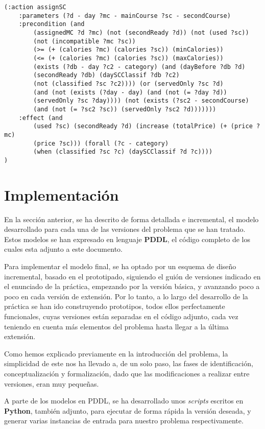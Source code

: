 \documentclass{article}
\begin{document}
\begin{lstlisting}[language=pddl]
(:action assignSC
    :parameters (?d - day ?mc - mainCourse ?sc - secondCourse)
    :precondition (and
        (assignedMC ?d ?mc) (not (secondReady ?d)) (not (used ?sc))
        (not (incompatible ?mc ?sc))
        (>= (+ (calories ?mc) (calories ?sc)) (minCalories))
        (<= (+ (calories ?mc) (calories ?sc)) (maxCalories))
        (exists (?db - day ?c2 - category) (and (dayBefore ?db ?d)
        (secondReady ?db) (daySCClassif ?db ?c2)
        (not (classified ?sc ?c2)))) (or (servedOnly ?sc ?d)
        (and (not (exists (?day - day) (and (not (= ?day ?d))
        (servedOnly ?sc ?day)))) (not (exists (?sc2 - secondCourse)
        (and (not (= ?sc2 ?sc)) (servedOnly ?sc2 ?d)))))))
    :effect (and
        (used ?sc) (secondReady ?d) (increase (totalPrice) (+ (price ?mc)
        (price ?sc))) (forall (?c - category)
        (when (classified ?sc ?c) (daySCClassif ?d ?c))))
)
\end{lstlisting}

\section{Implementación}
En la sección anterior, se ha descrito de forma detallada e incremental, el modelo desarrollado para cada una de las versiones del problema que se han tratado. Estos modelos se han expresado en lenguaje \textbf{PDDL}, el código completo de los cuales esta adjunto a este documento.
\par
Para implementar el modelo final, se ha optado por un esquema de diseño incremental, basado en el prototipado, siguiendo el guión de versiones indicado en el enunciado de la práctica, empezando por la versión básica, y avanzando poco a poco en cada versión de extensión. Por lo tanto, a lo largo del desarrollo de la práctica se han ido construyendo prototipos, todos ellos perfectamente funcionales, cuyas versiones están separadas en el código adjunto, cada vez teniendo en cuenta más elementos del problema hasta llegar a la última extensión.
\par
Como hemos explicado previamente en la introducción del problema, la simplicidad de este nos ha llevado a, de un solo paso, las fases de identificación, conceptualización y formalización, dado que las modificaciones a realizar entre versiones, eran muy pequeñas.
\par
A parte de los modelos en PDDL, se ha desarrollado unos \textit{scripts} escritos en \textbf{Python}, también adjunto, para ejecutar de forma rápida la versión deseada, y generar varias instancias de entrada para nuestro problema respectivamente.
\end{document}
